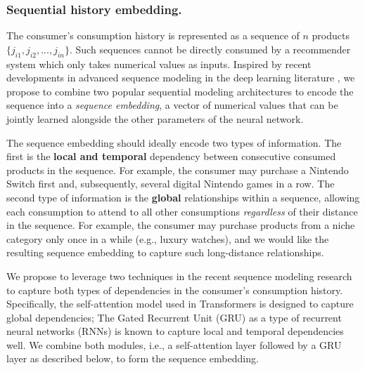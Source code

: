 \subsubsection{Sequential history embedding.}
\label{sec:framework_dnn_seq_embed} 
The consumer's consumption history is represented as a sequence of $n$ products $\{j_{i1}, j_{i2}, ..., j_{in}\}$. Such sequences cannot be directly consumed by a recommender system which only takes numerical values as inputs. Inspired by recent developments in advanced sequence modeling in the deep learning literature \citep{vaswani2017attention}, we propose to combine two popular sequential modeling architectures to encode the sequence into a \emph{sequence embedding}, a vector of numerical values that can be jointly learned alongside the other parameters of the neural network. 

The sequence embedding should ideally encode two types of information. The first is the \textbf{local and temporal} dependency between consecutive consumed products in the sequence. For example, the consumer may purchase a Nintendo Switch first and, subsequently, several digital Nintendo games in a row. The second type of information is the \textbf{global} relationships within a sequence, allowing each consumption to attend to all other consumptions \emph{regardless} of their distance in the sequence. For example, the consumer may purchase products from a niche category only once in a while (e.g., luxury watches), and we would like the resulting sequence embedding to capture such long-distance relationships. 

We propose to leverage two techniques in the recent sequence modeling research to capture both types of dependencies in the consumer's consumption history. Specifically, the self-attention model used in Transformers \citep{vaswani2017attention} is designed to capture global dependencies; The Gated Recurrent Unit (GRU) \citep{cho2014learning} as a type of recurrent neural networks (RNNs) is known to capture local and temporal dependencies well. %
We combine both modules, i.e., a self-attention layer followed by a GRU layer as described below, to form the sequence embedding. 

